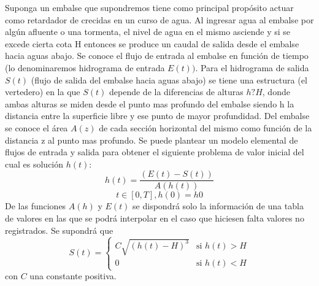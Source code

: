 \documentclass{article}
\begin{document}
Suponga un embalse que supondremos tiene como principal prop\'osito actuar como retardador de crecidas en un curso de agua. Al ingresar agua al embalse por alg\'un afluente o una tormenta, el nivel de agua en el mismo asciende y si se excede cierta cota H entonces se produce un caudal de salida desde el embalse hacia aguas abajo. Se conoce el flujo de entrada al embalse en funci\'on de tiempo (lo denominaremos hidrograma de entrada $E(t))$. Para el hidrograma de salida $S(t)$ (flujo de salida del embalse hacia aguas abajo) se tiene una estructura (el vertedero) en la que $S(t)$ depende de la diferencias de alturas $h ? H$, donde ambas alturas se miden desde el punto mas profundo del embalse siendo h la distancia entre la superficie libre y ese punto de mayor profundidad. Del embalse se conoce el \'area $A(z)$ de cada secci\'on horizontal del mismo como funci\'on de la distancia z al punto mas profundo.
Se puede plantear un modelo elemental de flujos de entrada y salida para obtener el siguiente problema de valor inicial del cual es soluci\'on $h(t)$:\\
\begin{displaymath}
h(t) =\frac{(E(t) - S(t))}{A(h(t))}
\end{displaymath}
\begin{displaymath}
 t \in [0, T ],	h(0) = h0
\end{displaymath}
De las funciones $A(h)$ y $E(t)$ se dispondr\'a solo la informaci\'on de una tabla de valores en las que se podr\'a interpolar en el caso que hiciesen falta valores no registrados. Se supondr\'a
que 
\begin{displaymath}
S(t) = \left\{
\begin{array}{cl}
C \sqrt{(h(t) -H)^3}&\mbox{si } h(t)>H\\
0&\mbox{si } h(t)<H
\end{array}\right.
\end{displaymath}
 con $C$ una constante positiva.\\
 
\end{document}
